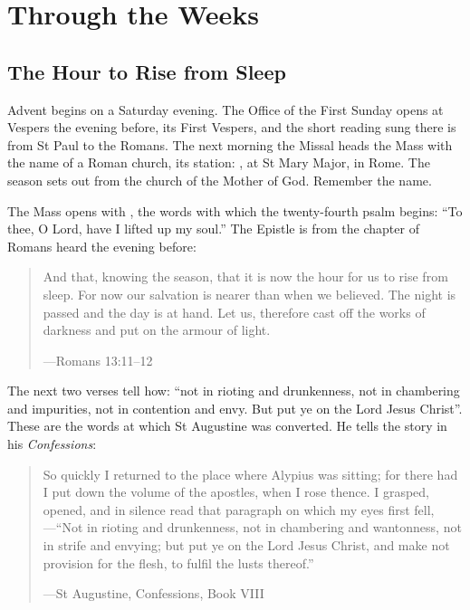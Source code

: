 \section{Through the Weeks}

\subsection{The Hour to Rise from Sleep}\label{sec:first-week}

Advent begins on a Saturday evening. The Office of the First Sunday opens at
Vespers the evening before, its First Vespers, and the short reading sung there
is from St Paul to the Romans. The next morning the Missal heads the Mass with
the name of a Roman church, its station: ,
at St Mary Major, in Rome. The season sets out from the church of the Mother
of God. Remember the name.

The Mass opens with , the words with which the
twenty-fourth psalm begins: ``To thee, O Lord, have I lifted up my soul.'' The
Epistle is from the chapter of Romans heard the evening before:

\begin{quote}
And that, knowing the season, that it is now the hour for us to rise from
sleep. For now our salvation is nearer than when we believed. The night is
passed and the day is at hand. Let us, therefore cast off the works of darkness
and put on the armour of light.\par
{\smallskip\noindent\small ---Romans 13:11--12\par}
\end{quote}

The next two verses tell how: ``not in rioting and drunkenness, not in chambering
and impurities, not in contention and envy. But put ye on the Lord Jesus
Christ''. These are the words at which St Augustine was converted. He tells the
story in his \textit{Confessions}:

\begin{quote}
So quickly I returned to the place where Alypius was sitting; for there had I
put down the volume of the apostles, when I rose thence. I grasped, opened, and
in silence read that paragraph on which my eyes first fell,---``Not in rioting
and drunkenness, not in chambering and wantonness, not in strife and envying;
but put ye on the Lord Jesus Christ, and make not provision for the flesh, to
fulfil the lusts thereof.''\par
{\smallskip\noindent\small ---St Augustine, Confessions, Book VIII\par}
\end{quote}


